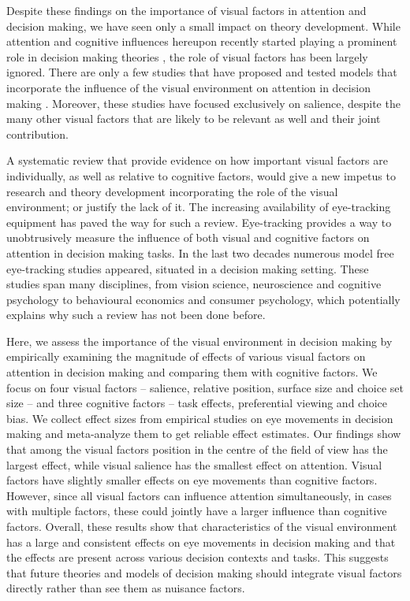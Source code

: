 \documentclass{article}
\begin{document}
Despite these findings on the importance of visual factors in attention and decision making, we have seen only a small impact on theory development. While attention and cognitive influences hereupon recently started playing a prominent role in decision making theories \citep{callaway2019a, gluth2018, gluth2020, krajbich2010a}, the role of visual factors has been largely ignored. There are only a few studies that have proposed and tested models that incorporate the influence of the visual environment on attention in decision making \citep{chen2013, navalpakkam2010, towal2013a}. Moreover, these studies have focused exclusively on salience, despite the many other visual factors that are likely to be relevant as well and their joint contribution. 

A systematic review that provide evidence on how important visual factors are individually, as well as relative to cognitive factors, would give a new impetus to research and theory development incorporating the role of the visual environment; or justify the lack of it. The increasing availability of eye-tracking equipment has paved the way for such a review. Eye-tracking provides a way to unobtrusively measure the influence of both visual and cognitive factors on attention in decision making tasks. In the last two decades numerous model free eye-tracking studies appeared, situated in a decision making setting. These studies span many disciplines, from vision science, neuroscience and cognitive psychology to behavioural economics and consumer psychology, which potentially explains why such a review has not been done before.



Here, we assess the importance of the visual environment in decision making by empirically examining the magnitude of effects of various visual factors on attention in decision making and comparing them with cognitive factors. We focus on four visual factors – salience, relative position, surface size and choice set size – and three cognitive factors – task effects, preferential viewing and choice bias. We collect effect sizes from empirical studies on eye movements in decision making and meta-analyze them to get reliable effect estimates. Our findings show that among the visual factors position in the centre of the field of view has the largest effect, while visual salience has the smallest effect on attention. Visual factors have slightly smaller effects on eye movements than cognitive factors.  However, since all visual factors can influence attention simultaneously, in cases with multiple factors, these could jointly have a larger influence than cognitive factors. Overall, these results show that characteristics of the visual environment has a large and consistent effects on eye movements in decision making and that the effects are present across various decision contexts and tasks. This suggests that future theories and models of decision making should integrate visual factors directly rather than see them as nuisance factors.
\end{document}
